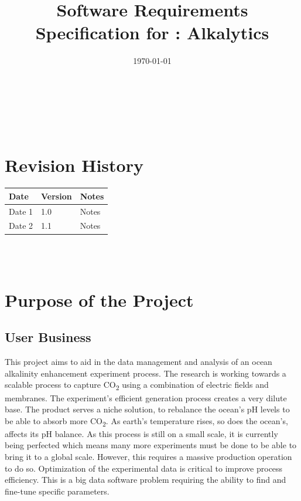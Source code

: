 \documentclass[12pt]{article}
\begin{document}
\title{Software Requirements Specification for \progname: Alkalytics} 
\author{\authname}
\date{\today}
	
\maketitle

~\newpage


\tableofcontents

~\newpage

\section*{Revision History}

\begin{tabularx}{\textwidth}{p{3cm}p{2cm}X} \toprule {\textbf{Date}} &
{\textbf{Version}} & {\textbf{Notes}}\\
\midrule
Date 1 & 1.0 & Notes\\
Date 2 & 1.1 & Notes\\
\bottomrule
\end{tabularx}

~\\

~\newpage
\section{Purpose of the Project}
\subsection{User Business}
This project aims to aid in the data management and analysis of an ocean
alkalinity enhancement experiment process. The research is working towards a
scalable process to capture CO\textsubscript{2} using a combination of electric
fields and membranes. The experiment's efficient generation process creates a
very dilute base. The product serves a niche solution, to rebalance the ocean's
pH levels to be able to absorb more CO\textsubscript{2}. As earth’s temperature
rises, so does the ocean’s, affects its pH balance. As this process is still on
a small scale, it is currently being perfected which means many more experiments
must be done to be able to bring it to a global scale. However, this requires a
massive production operation to do so. Optimization of the experimental data is
critical to improve process efficiency. This is a big data software problem
requiring the ability to find and fine-tune specific parameters. 
\end{document}
